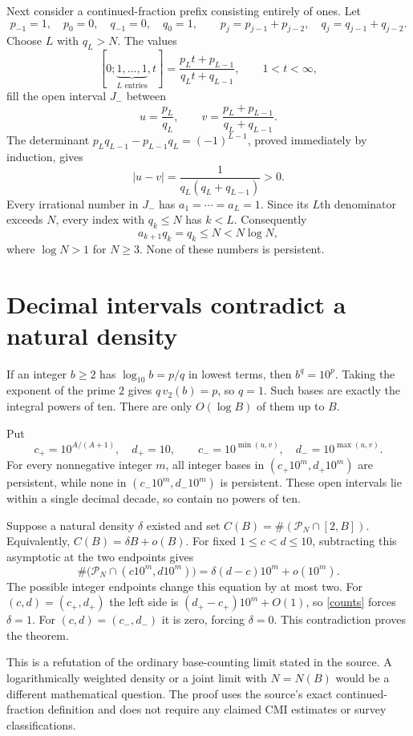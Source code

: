 \documentclass[11pt]{article}
\newcommand{\PN}{\mathcal P_N}
\begin{document}
Next consider a continued-fraction prefix consisting entirely of ones.
Let
\[
 p_{-1}=1,\quad p_0=0,\quad q_{-1}=0,\quad q_0=1,
 \qquad p_j=p_{j-1}+p_{j-2},\quad q_j=q_{j-1}+q_{j-2}.
\]
Choose $L$ with $q_L>N$. The values
\[
 [0;\underbrace{1,\ldots,1}_{L\text{ entries}},t]
       =\frac{p_Lt+p_{L-1}}{q_Lt+q_{L-1}},\qquad 1<t<\infty,
\]
fill the open interval $J_-$ between
\[
 u=\frac{p_L}{q_L},\qquad
 v=\frac{p_L+p_{L-1}}{q_L+q_{L-1}}.
\]
The determinant $p_Lq_{L-1}-p_{L-1}q_L=(-1)^{L-1}$,
proved immediately by induction, gives
\[
 |u-v|=\frac1{q_L(q_L+q_{L-1})}>0.
\]
Every irrational number in $J_-$ has $a_1=\cdots=a_L=1$.
Since its $L$th denominator exceeds $N$, every index with $q_k\le N$
has $k<L$. Consequently
\[
 a_{k+1}q_k=q_k\le N<N\log N,
\]
where $\log N>1$ for $N\ge3$. None of these numbers is persistent.

\section*{Decimal intervals contradict a natural density}
If an integer $b\ge2$ has $\log_{10}b=p/q$ in lowest terms, then
$b^q=10^p$. Taking the exponent of the prime $2$ gives
$q\,v_2(b)=p$, so $q=1$. Such bases are exactly the integral powers
of ten. There are only $O(\log B)$ of them up to $B$.

Put
\[
 c_+=10^{A/(A+1)},\quad d_+=10,\qquad
 c_-=10^{\min(u,v)},\quad d_-=10^{\max(u,v)}.
\]
For every nonnegative integer $m$, all integer bases in
$(c_+10^m,d_+10^m)$ are persistent, while none in
$(c_-10^m,d_-10^m)$ is persistent. These open intervals lie within
a single decimal decade, so contain no powers of ten.

Suppose a natural density $\delta$ existed and set
$C(B)=\#(\PN\cap[2,B])$. Equivalently, $C(B)=\delta B+o(B)$.
For fixed $1\le c<d\le10$, subtracting this asymptotic at the two
endpoints gives
\begin{equation}\label{counts}
 \#\bigl(\PN\cap(c10^m,d10^m)\bigr)
    =\delta(d-c)10^m+o(10^m).
\end{equation}
The possible integer endpoints change this equation by at most two.
For $(c,d)=(c_+,d_+)$ the left side is
$(d_+-c_+)10^m+O(1)$, so \eqref{counts} forces $\delta=1$.
For $(c,d)=(c_-,d_-)$ it is zero, forcing $\delta=0$.
This contradiction proves the theorem.

This is a refutation of the ordinary base-counting limit stated in
the source. A logarithmically weighted density or a joint limit with
$N=N(B)$ would be a different mathematical question. The proof uses
the source's exact continued-fraction definition and does not require
any claimed CMI estimates or survey classifications.
\end{document}
